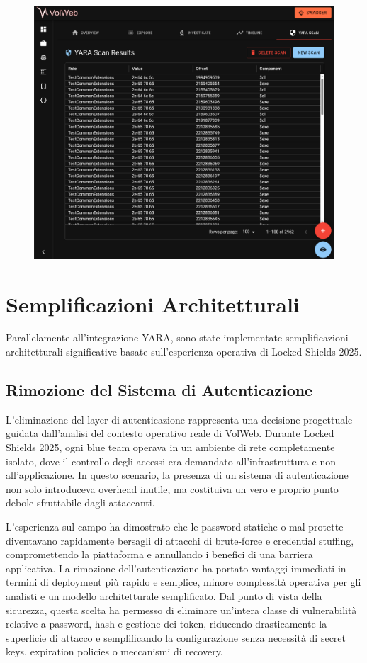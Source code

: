 \begin{figure}[H]
\centering
\includegraphics[width=1\linewidth]{images/volweb-esteso/volweb-scanresult.png}
\end{figure}


\section{Semplificazioni Architetturali}

Parallelamente all'integrazione YARA, sono state implementate semplificazioni architetturali significative basate sull'esperienza operativa di Locked Shields 2025.

\subsection{Rimozione del Sistema di Autenticazione}

L'eliminazione del layer di autenticazione rappresenta una decisione progettuale guidata dall'analisi del contesto operativo reale di VolWeb. Durante Locked Shields 2025, ogni blue team operava in un ambiente di rete completamente isolato, dove il controllo degli accessi era demandato all'infrastruttura e non all'applicazione. In questo scenario, la presenza di un sistema di autenticazione non solo introduceva overhead inutile, ma costituiva un vero e proprio punto debole sfruttabile dagli attaccanti.

L'esperienza sul campo ha dimostrato che le password statiche o mal protette diventavano rapidamente bersagli di attacchi di brute-force e credential stuffing, compromettendo la piattaforma e annullando i benefici di una barriera applicativa. La rimozione dell'autenticazione ha portato vantaggi immediati in termini di deployment più rapido e semplice, minore complessità operativa per gli analisti e un modello architetturale semplificato. Dal punto di vista della sicurezza, questa scelta ha permesso di eliminare un'intera classe di vulnerabilità relative a password, hash e gestione dei token, riducendo drasticamente la superficie di attacco e semplificando la configurazione senza necessità di secret keys, expiration policies o meccanismi di recovery.

